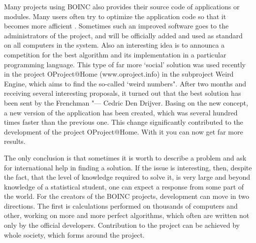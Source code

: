 \documentclass[10pt, a5paper]{article}
\begin{document}
Many projects using BOINC also provides their source code of applications or modules. Many users often try to optimize the application code so that it becomes more afficient . Sometimes such an improved software goes to the administrators of the project, and will be officially added and used as standard on all computers in the system. Also an interesting idea is to announca a competition for the best algorithm and its implementation in a particular programming language. This type of far more `social' solution was used recently in the project OPro\-ject@\-Ho\-me (www.oproject.info) in the subproject Weird Engine, which aims to find the so-called `weird numbers". After two months and receiving several interesting proposals, it turned out that the best solution has been sent by the Frenchman "--- Cedric Den Drijver. Basing on the new concept, a new version of the application has been created, which was several hundred times faster than the previous one. This change significantly contributed to the development of the project OPro\-ject@\-Ho\-me. With it you can now get far more results.

The only conclusion is that sometimes it is worth to describe a problem and ask for international help in finding a solution. If the issue is interesting, then, despite the fact, that the level of knowledge required to solve it, is very large and beyond knowledge of a statistical student, one can expect a response from some part of the world. For the creators of the BOINC projects, development can move in two directions. The first is calculations performed on thousands of computers and other, working on more and more perfect algorithms, which often are written not only by the official developers. Contribution to the project can be achieved by whole society, which forms around the project.
\end{document}
